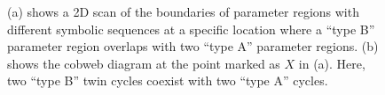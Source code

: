 \begin{figure}
	\centering
	\caption[2D boundary scan and cobweb diagram of the original model showing coexistence of four cycles]{
		(a) shows a 2D scan of the boundaries of parameter regions with different symbolic sequences at a specific location where a ``type B'' parameter region overlaps with two ``type A'' parameter regions.
		(b) shows the cobweb diagram at the point marked as $X$ in (a).
		Here, two ``type B'' twin cycles coexist with two ``type A'' cycles.
	}
\end{figure}
